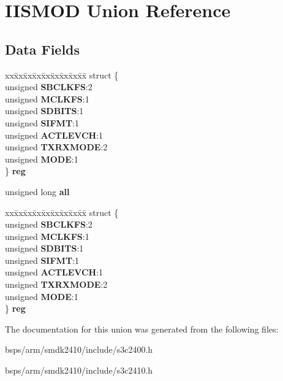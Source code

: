 \hypertarget{unionIISMOD}{}\section{I\+I\+S\+M\+OD Union Reference}
\label{unionIISMOD}
\subsection*{Data Fields}
\begin{DoxyCompactItemize}
\item 
\mbox{\label{unionIISMOD_a246428912a9c7f6d18048361319cc4e1}} 
\begin{tabbing}
xx\=xx\=xx\=xx\=xx\=xx\=xx\=xx\=xx\=\kill
struct \{\\
\>unsigned {\bfseries SBCLKFS}:2\\
\>unsigned {\bfseries MCLKFS}:1\\
\>unsigned {\bfseries SDBITS}:1\\
\>unsigned {\bfseries SIFMT}:1\\
\>unsigned {\bfseries ACTLEVCH}:1\\
\>unsigned {\bfseries TXRXMODE}:2\\
\>unsigned {\bfseries MODE}:1\\
\} {\bfseries reg}\\

\end{tabbing}\item 
\mbox{\label{unionIISMOD_a905784cb71e9b9267e3b96c96b977d4b}} 
unsigned long {\bfseries all}
\item 
\mbox{\label{unionIISMOD_aa3731f51fa4c85f09350f8d7173fafef}} 
\begin{tabbing}
xx\=xx\=xx\=xx\=xx\=xx\=xx\=xx\=xx\=\kill
struct \{\\
\>unsigned {\bfseries SBCLKFS}:2\\
\>unsigned {\bfseries MCLKFS}:1\\
\>unsigned {\bfseries SDBITS}:1\\
\>unsigned {\bfseries SIFMT}:1\\
\>unsigned {\bfseries ACTLEVCH}:1\\
\>unsigned {\bfseries TXRXMODE}:2\\
\>unsigned {\bfseries MODE}:1\\
\} {\bfseries reg}\\

\end{tabbing}\end{DoxyCompactItemize}


The documentation for this union was generated from the following files\+:\begin{DoxyCompactItemize}
\item 
bsps/arm/smdk2410/include/s3c2400.\+h\item 
bsps/arm/smdk2410/include/s3c2410.\+h\end{DoxyCompactItemize}
